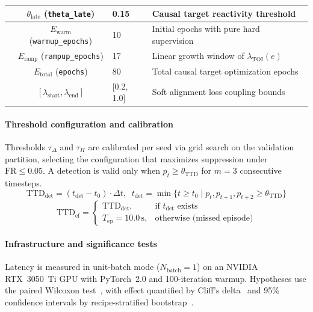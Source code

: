 \documentclass[a4paper,fleqn]{cas-dc}
\begin{document}
\begin{table}[!tbp]
\begin{tabularx}{\textwidth}{l c l X}
 & $\theta_{\text{late}}$ (\texttt{theta\_late})   & 0.15 & Causal target reactivity threshold \\
\midrule
{}
 & $E_{\text{warm}}$ (\texttt{warmup\_epochs}) & 10 & Initial epochs with pure hard supervision \\
 & $E_{\text{ramp}}$ (\texttt{rampup\_epochs})  & 17 & Linear growth window of $\lambda_{\mathrm{TOI}}(e)$ \\
 & $E_{\text{total}}$ (\texttt{epochs})         & 80 & Total causal target optimization epochs \\
 & $[\lambda_{\text{start}}, \lambda_{\text{end}}]$ & [0.2, 1.0] & Soft alignment loss coupling bounds \\
\bottomrule
\end{tabularx}
\end{table}
\paragraph{Threshold configuration and calibration}
Thresholds $\tau_\Delta$ and $\tau_H$ are calibrated per seed via grid search
on the validation partition, selecting the configuration that maximizes
suppression under $\mathrm{FR}\le0.05$. A detection is valid only when
$p_t \ge \theta_{\mathrm{TTD}}$ for $m=3$ consecutive timesteps.
\begin{equation}
\mathrm{TTD}_{\mathrm{det}} = (t_{\mathrm{det}} - t_0)\cdot\Delta t,
\;\;
t_{\mathrm{det}} = \min\{t \ge t_0 \mid p_t, p_{t+1}, p_{t+2} \ge
\theta_{\mathrm{TTD}}\}
\label{eq:ttd_nominal}
\end{equation}
\begin{equation}
\mathrm{TTD}_{\mathrm{ef}} =
\begin{cases}
\mathrm{TTD}_{\mathrm{det}}, & \text{if } t_{\mathrm{det}}
  \text{ exists} \\
T_{\mathrm{ep}} = 10.0\,\text{s}, & \text{otherwise (missed episode)}
\end{cases}
\label{eq:ttd_efetivo}
\end{equation}
\paragraph{Infrastructure and significance tests}
Latency is measured in unit-batch mode ($N_{\text{batch}}=1$) on an
NVIDIA RTX~3050~Ti GPU with PyTorch~2.0 and 100-iteration warmup.
Hypotheses use the paired Wilcoxon test~\cite{wilcoxon1945}, with effect
quantified by Cliff's delta~\cite{cliff1993dominance} and 95\%
confidence intervals by recipe-stratified
bootstrap~\cite{efron1993introduction}.
\end{document}
